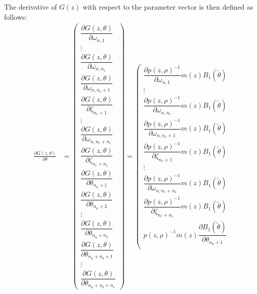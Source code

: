 \documentclass{article}
\begin{document}
The derivative of $G(z)$ with respect to the parameter vector is then defined as follows:
\begin{equation}
\begin{aligned}
\frac{\partial G(z,\theta)}{\partial \theta} &= 
\left(\begin{array}{c} 
\dfrac{\partial G(z,\theta)}{\partial \omega_{n,1}} \\
\vdots \\
\dfrac{\partial G(z,\theta)}{\partial \omega_{n,n_r}} \\
\dfrac{\partial G(z,\theta)}{\partial \omega_{n,n_r+1}} \\ \dfrac{\partial G(z,\theta)}{\partial \zeta_{n_r+1}} \\ \vdots \\ \dfrac{\partial G(z,\theta)}{\partial \omega_{n,n_r+n_i}} \\ \dfrac{\partial G(z,\theta)}{\partial \zeta_{n_r+n_i}} \\ \hline \dfrac{\partial G(z,\theta)}{\partial \theta_{n_a + 1}} \\ \dfrac{\partial G(z,\theta)}{\partial \theta_{n_a + 2}} \\ \vdots \\ \dfrac{\partial G(z,\theta)}{\partial \theta_{n_a + n_b }} \\ \hline \dfrac{\partial G(z,\theta)}{\partial \theta_{n_a + n_b + 1}} \\ \vdots \\ \dfrac{\partial G(z,\theta)}{\partial \theta_{n_a + n_b + n_c}} 
\end{array} \right)
= 
\left(\begin{array}{c} 
\dfrac{\partial p(z,\rho)^{-1}}{\partial \omega_{n,1}} m(z) B_1(\tilde{\theta}) \\ 
\vdots \\
\dfrac{\partial p(z,\rho)^{-1}}{\partial \omega_{n,n_r}} m(z) B_1(\tilde{\theta}) \\ 
\dfrac{\partial p(z,\rho)^{-1}}{\partial \omega_{n,n_r+1}} m(z) B_1(\tilde{\theta}) \\  
\dfrac{\partial p(z,\rho)^{-1}}{\partial \zeta_{n_r+1}} m(z) B_1(\tilde{\theta}) \\ 
\vdots \\ 
\dfrac{\partial p(z,\rho)^{-1}}{\partial \omega_{n,n_r+n_i}} m(z) B_1(\tilde{\theta}) \\  
\dfrac{\partial p(z,\rho)^{-1}}{\partial \zeta_{n_r+n_i}} m(z) B_1(\tilde{\theta}) \\  
\hline p(z,\rho)^{-1} m(z) \dfrac{\partial B_1(\tilde{\theta})}{\partial \theta_{n_a+1}} \\ 

\end{array}
\end{aligned}
\end{equation}
\end{document}
